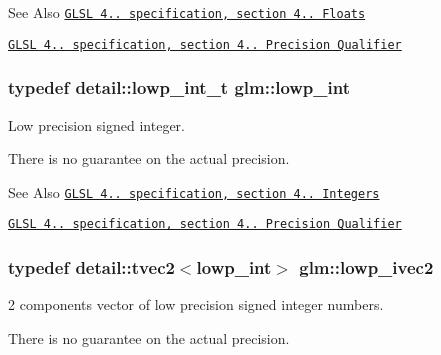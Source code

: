 \begin{DoxySeeAlso}{See Also}
\href{http://www.opengl.org/registry/doc/GLSLangSpec.4.20.8.pdf}{\tt G\-L\-S\-L 4.. specification, section 4.. Floats} 

\href{http://www.opengl.org/registry/doc/GLSLangSpec.4.20.8.pdf}{\tt G\-L\-S\-L 4.. specification, section 4.. Precision Qualifier} 
\end{DoxySeeAlso}
\hypertarget{group__core__precision_ga4681244bf4a184734f03aa9df4e3d288}{
\subsubsection[{lowp\-\_\-int}]{\setlength{\rightskip}{0pt plus 5cm}typedef detail\-::lowp\-\_\-int\-\_\-t {\bf glm\-::lowp\-\_\-int}}}\label{group__core__precision_ga4681244bf4a184734f03aa9df4e3d288}


Low precision signed integer. 

There is no guarantee on the actual precision.

\begin{DoxySeeAlso}{See Also}
\href{http://www.opengl.org/registry/doc/GLSLangSpec.4.20.8.pdf}{\tt G\-L\-S\-L 4.. specification, section 4.. Integers} 

\href{http://www.opengl.org/registry/doc/GLSLangSpec.4.20.8.pdf}{\tt G\-L\-S\-L 4.. specification, section 4.. Precision Qualifier} 
\end{DoxySeeAlso}
\hypertarget{group__core__precision_ga5e59209b39a7d334f8b4bad8c01ea045}{
\subsubsection[{lowp\-\_\-ivec2}]{\setlength{\rightskip}{0pt plus 5cm}typedef detail\-::tvec2$<$lowp\-\_\-int$>$ {\bf glm\-::lowp\-\_\-ivec2}}}\label{group__core__precision_ga5e59209b39a7d334f8b4bad8c01ea045}


2 components vector of low precision signed integer numbers. 

There is no guarantee on the actual precision.

